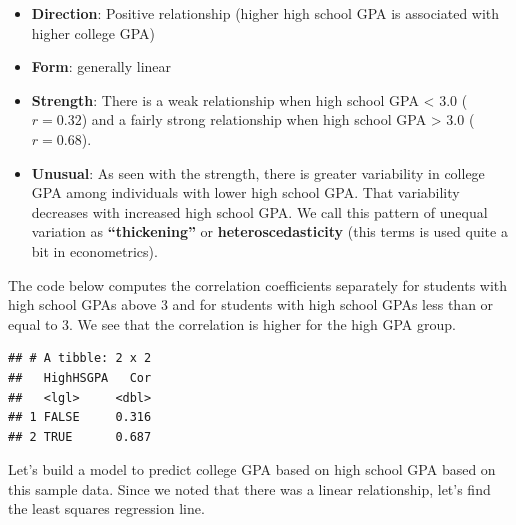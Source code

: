 \documentclass[]{book}
\newenvironment{Shaded}{\begin{snugshade}}{\end{snugshade}}
\newcommand{\DataTypeTok}[1]{\textcolor[rgb]{0.13,0.29,0.53}{#1}}
\newcommand{\DecValTok}[1]{\textcolor[rgb]{0.00,0.00,0.81}{#1}}
\newcommand{\KeywordTok}[1]{\textcolor[rgb]{0.13,0.29,0.53}{\textbf{#1}}}
\newcommand{\NormalTok}[1]{#1}
\newcommand{\OperatorTok}[1]{\textcolor[rgb]{0.81,0.36,0.00}{\textbf{#1}}}
\newcommand{\StringTok}[1]{\textcolor[rgb]{0.31,0.60,0.02}{#1}}
\providecommand{\tightlist}{%
  \setlength{\itemsep}{0pt}\setlength{\parskip}{0pt}}
\begin{document}
\begin{itemize}
\tightlist
\item
  \textbf{Direction}: Positive relationship (higher high school GPA is associated with higher college GPA)
\item
  \textbf{Form}: generally linear
\item
  \textbf{Strength}: There is a weak relationship when high school GPA \textless{} 3.0 (\(r = 0.32\)) and a fairly strong relationship when high school GPA \textgreater{} 3.0 (\(r = 0.68\)).
\item
  \textbf{Unusual}: As seen with the strength, there is greater variability in college GPA among individuals with lower high school GPA. That variability decreases with increased high school GPA. We call this pattern of unequal variation as \textbf{``thickening''} or \textbf{heteroscedasticity} (this terms is used quite a bit in econometrics).
\end{itemize}

The code below computes the correlation coefficients separately for students with high school GPAs above 3 and for students with high school GPAs less than or equal to 3. We see that the correlation is higher for the high GPA group.

\begin{Shaded}
\end{Shaded}

\begin{verbatim}
## # A tibble: 2 x 2
##   HighHSGPA   Cor
##   <lgl>     <dbl>
## 1 FALSE     0.316
## 2 TRUE      0.687
\end{verbatim}

Let's build a model to predict college GPA based on high school GPA based on this sample data. Since we noted that there was a linear relationship, let's find the least squares regression line.

\begin{Shaded}
\end{Shaded}
\end{document}
